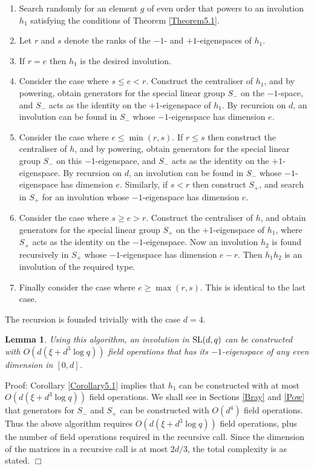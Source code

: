 \documentclass[12pt]{article}
\newtheorem{lemma}[definition]{Lemma}
\newenvironment{proof}{\normalsize {\sc Proof}:}{{\hfill $\Box$ \\}}
\def\SL{{\rm SL}}
\begin{document}
\begin{enumerate}
\item 
Search randomly for an element $g$ of even order
that powers to an involution $h_1$
satisfying the conditions of Theorem \ref{Theorem5.1}.

\item Let $r$ and $s$ denote the ranks of the 
$-1$- and $+1$-eigenspaces of $h_1$.

\item If $r = e$ then $h_1$ is the desired involution.
 
\item 
Consider the case where $s \leq e < r$.
Construct the centraliser of  $h_1$, and by powering, obtain 
generators for the special linear group
$S_-$ on the $-1$-space, and $S_-$ acts as the identity on the
$+1$-eigenspace of $h_1$. 
By recursion on $d$, an involution 
can be found in $S_-$ whose $-1$-eigenspace    
has dimension $e$. 

\item 
Consider the case where $e \leq \min(r, s)$.
If $r \leq s$ then 
construct the centraliser of  $h$, and by powering, obtain 
generators for the special linear group
$S_-$ on this $-1$-eigenspace,
and $S_-$ acts as the identity on the $+1$-eigenspace.
By recursion on $d$, an involution 
can be found in $S_-$ whose $-1$-eigenspace    
has dimension $e$. 
Similarly, if $s < r$ then construct $S_+$,
and search in $S_+$ for an involution
whose $-1$-eigenspace has dimension $e$. 

\item 
Consider the case where $s \geq e > r$.
Construct the centraliser of $h$, and obtain generators
for the special linear group $S_+$ on the $+1$-eigenspace of $h_1$,
where $S_+$ acts as the identity on the $-1$-eigenspace.
Now an involution $h_2$ is found recursively in
$S_+$ whose $-1$-eigenspace has dimension $e-r$. 
Then $h_1h_2$ is an involution of the required type. 

\item Finally consider the case where $e \geq \max(r, s)$.
This is identical to the last case.

\end{enumerate}
The recursion is founded trivially with the case $d=4$.

\begin{lemma}\label{Corollary5.2}  
Using this algorithm, an involution in $\SL(d,q)$
can be constructed with $O(d(\xi + d^3 \log q))$ field operations that has its
$-1$-eigenspace of any even dimension in $[0,d]$.
\end{lemma}
\begin{proof}
Corollary \ref{Corollary5.1} implies that $h_1$ can be constructed with at most 
$O(d(\xi + d^3 \log q))$ field operations. We shall see in 
Sections \ref{Bray} and 
\ref{Pow} that  generators for $S_-$ and $S_+$ can be constructed
with $O(d^4)$ field operations. Thus the above algorithm requires
$O(d(\xi + d^3 \log q))$ field operations, plus the number of field operations
required in the recursive call. Since the dimension of the matrices
in a recursive call is at most $2d/3$, the total
complexity is as stated.
\end{proof}
\end{document}
